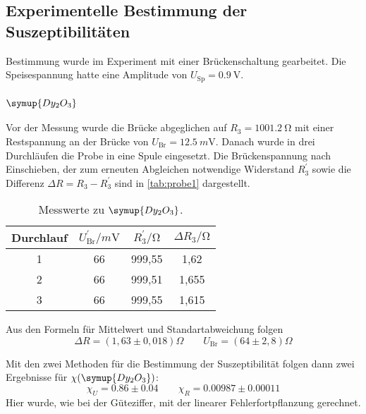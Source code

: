 \subsection{Experimentelle Bestimmung der Suszeptibilitäten}
\label{sec:Experimentelle Bestimmung der Suszeptibilitäten}

Bestimmung wurde im Experiment mit einer Brückenschaltung gearbeitet. Die Speisespannung
hatte eine Amplitude von $U_\text{Sp} = \SI{0.9}{\volt}$.

\subsubsection{$\symup{Dy_2O_3}$}

Vor der Messung wurde die Brücke abgeglichen auf $R_3 = \SI{1001.2}{\ohm}$ mit einer
Restspannung an der Brücke von $U_\text{Br} = \SI{12.5}{m\volt}$. Danach wurde in drei
Durchläufen die Probe in eine Spule eingesetzt. Die Brückenspannung nach Einschieben, der
zum erneuten Abgleichen notwendige Widerstand $R_3^\prime$ sowie die Differenz 
$\Delta R = R_3 - R_3^\prime$ sind in \autoref{tab:probe1} dargestellt.

\begin{table}
  \centering
  \caption{Messwerte zu $\symup{Dy_2O_3}$.}
  \label{tab:probe1}
  \begin{tabular}{c c c c}
  \toprule
  Durchlauf &
  $U_\text{Br}^\prime / \si{m\volt}$ &
  $R_3^\prime / \si{\ohm} $ &
  $\Delta R_3 / \si{\ohm} $ \\
  \midrule
  1 & 66 & 999,55 & 1,62 \\
  2 & 66 & 999,51 & 1,655 \\
  3 & 66 & 999,55 & 1,615 \\
  \bottomrule
  \end{tabular}
\end{table}

Aus den Formeln für Mittelwert und Standartabweichung folgen
\begin{equation}
	\Delta R = (1,63 \pm 0,018) \Omega
	\qquad
	U_\text{Br} = (64 \pm 2,8) \Omega
\end{equation}

Mit den zwei Methoden für die Bestimmung der Suszeptibilität folgen dann zwei Ergebnisse
für $\chi(\symup{Dy_2O_3})$:
\begin{equation}
	\chi_U = 0.86 \pm 0.04
	\qquad
	\chi_R = 0.00987 \pm 0.00011
\end{equation}
Hier wurde, wie bei der Güteziffer, mit der linearer Fehlerfortpflanzung gerechnet.
